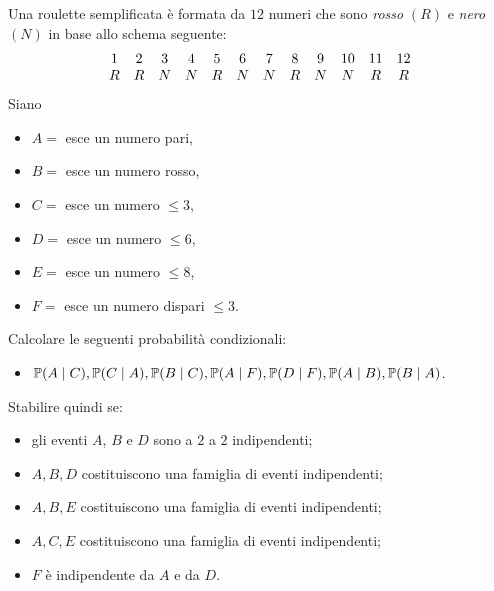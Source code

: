 Una roulette semplificata è formata da $12$ numeri che sono \emph{rosso} $( R)$ e \emph{nero} $( N)$ in base allo schema seguente:
\begin{equation*}
	\begin{array}{ c c c c c c c c c c c c }
		1 & 2 & 3 & 4 & 5 & 6 & 7 & 8 & 9 & 10 & 11 & 12\\
		R & R & N & N & R & N & N & R & N & N  & R  & R
	\end{array}
\end{equation*}
Siano
\begin{itemize}
	\item $A=$ esce un numero pari,
	\item $B=$ esce un numero rosso,
	\item $C=$ esce un numero $\leq 3$,
	\item $D=$ esce un numero $\leq 6$,
	\item $E=$ esce un numero $\leq 8$,
	\item $F=$ esce un numero dispari $\leq 3$.
\end{itemize}
Calcolare le seguenti probabilità condizionali:
\begin{itemize}
	\item $\mathbb{P}( A\mid C) ,\mathbb{P}( C\mid A) ,\mathbb{P}( B\mid C) ,\mathbb{P}( A\mid F) ,\mathbb{P}( D\mid F) ,\mathbb{P}( A\mid B) ,\mathbb{P}( B\mid A)$.
\end{itemize}
Stabilire quindi se:
\begin{itemize}
	\item gli eventi $A$, $B$ e $D$ sono a $2$ a $2$ indipendenti;
	\item $A,B,D$ costituiscono una famiglia di eventi indipendenti;
	\item $A,B,E$ costituiscono una famiglia di eventi indipendenti;
	\item $A,C,E$ costituiscono una famiglia di eventi indipendenti;
	\item $F$ è indipendente da $A$ e da $D$.
\end{itemize}

\Esercizio{}

